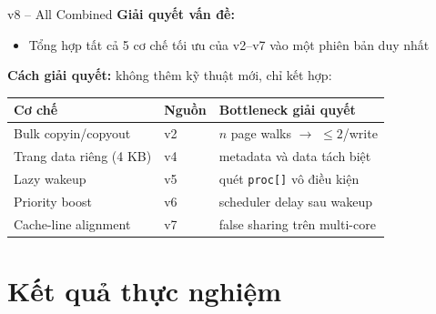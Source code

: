 \documentclass[aspectratio=169]{beamer}
\begin{document}
\begin{frame}{v8 -- All Combined}
    \textbf{Giải quyết vấn đề:}
    \begin{itemize}
        \item Tổng hợp tất cả 5 cơ chế tối ưu của v2--v7 vào một phiên bản duy nhất
    \end{itemize}

    \vspace{0.4em}
    \textbf{Cách giải quyết:} không thêm kỹ thuật mới, chỉ kết hợp:
    \vspace{0.3em}

    \small
    \begin{tabular}{lll}
        \toprule
        \textbf{Cơ chế} & \textbf{Nguồn} & \textbf{Bottleneck giải quyết} \\
        \midrule
        Bulk copyin/copyout  & v2 & $n$ page walks $\to$ $\leq 2$/write \\
        Trang data riêng (4 KB) & v4 & metadata và data tách biệt \\
        Lazy wakeup          & v5 & quét \texttt{proc[]} vô điều kiện \\
        Priority boost       & v6 & scheduler delay sau wakeup \\
        Cache-line alignment & v7 & false sharing trên multi-core \\
        \bottomrule
    \end{tabular}
\end{frame}

\section{Kết quả thực nghiệm}
\end{document}
